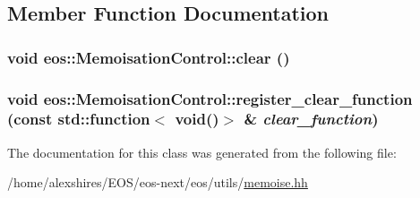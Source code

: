 \subsection{Member Function Documentation}
\hypertarget{classeos_1_1MemoisationControl_a36c8f1afbaed242d480619a847f51b7d}{
\subsubsection[{clear}]{\setlength{\rightskip}{0pt plus 5cm}void eos::MemoisationControl::clear ()}}
\label{classeos_1_1MemoisationControl_a36c8f1afbaed242d480619a847f51b7d}
\hypertarget{classeos_1_1MemoisationControl_a32eabb533067c5313d5154930f6fbb2f}{
\subsubsection[{register\_\-clear\_\-function}]{\setlength{\rightskip}{0pt plus 5cm}void eos::MemoisationControl::register\_\-clear\_\-function (const std::function$<$ void()$>$ \& {\em clear\_\-function})}}
\label{classeos_1_1MemoisationControl_a32eabb533067c5313d5154930f6fbb2f}


The documentation for this class was generated from the following file:\begin{DoxyCompactItemize}
\item 
/home/alexshires/EOS/eos-\/next/eos/utils/\hyperlink{memoise_8hh}{memoise.hh}\end{DoxyCompactItemize}
